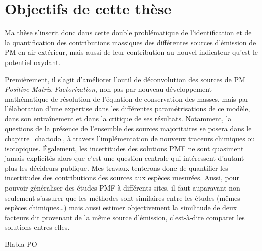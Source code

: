 \section{Objectifs de cette thèse}%
\label{sec:positionnement_de_cette_thèse}

Ma thèse s'inscrit donc dans cette double problématique de l'identification et de la
quantification des contributions massiques des différentes sources d'émission de PM en air
extérieur, mais aussi de leur contribution au nouvel indicateur qu'est le potentiel
oxydant.

Premièrement, il s'agit d'améliorer l'outil de déconvolution des sources de PM
\textit{Positive Matrix Factorization}, non pas par nouveau développement mathématique de
résolution de l'équation de conservation des masses, mais par l'élaboration d'une
expertise dans les différentes paramétrisations de ce modèle, dans son entraînement et
dans la critique de ses résultats. Notamment, la questions de la présence de l'ensemble
des sources majoritaires se posera dans le chapitre~\ref{cha:todo}, à travers
l'implémentation de nouveux traceurs chimiques ou isotopiques.
Également, les incertitudes des solutions PMF ne sont quasiment jamais explicités alors
que c'est une question centrale qui intéressent d'autant plus les décideurs publique. Mes
travaux tenterons donc de quantifier les incertitudes des contributions des sources aux
espèces mesurées.
Aussi, pour pouvoir généraliser des études PMF à différents sites, il faut auparavant
non seulement s'assurer que les méthodes sont similaires entre les études (mêmes espèces
chimiques…) mais aussi estimer objectivement la similitude de deux facteurs dit provenant
de la même source d'émission, c'est-à-dire comparer les solutions entres elles.

Blabla PO

